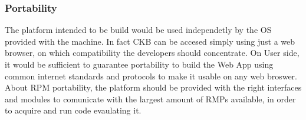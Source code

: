 \subsubsection{Portability}
The platform intended to be build would be used independetly by the OS provided with the machine. In fact CKB can be accesed simply using just a web browser, on which compatibility the developers should concentrate. On User side, it would be sufficient to guarantee portability to build the Web App using common internet standards and protocols to make it usable on any web broswer. About RPM portability, the platform should be provided with the right interfaces and modules to comunicate with the largest amount of RMPs available, in order to acquire and run code evaulating it.





